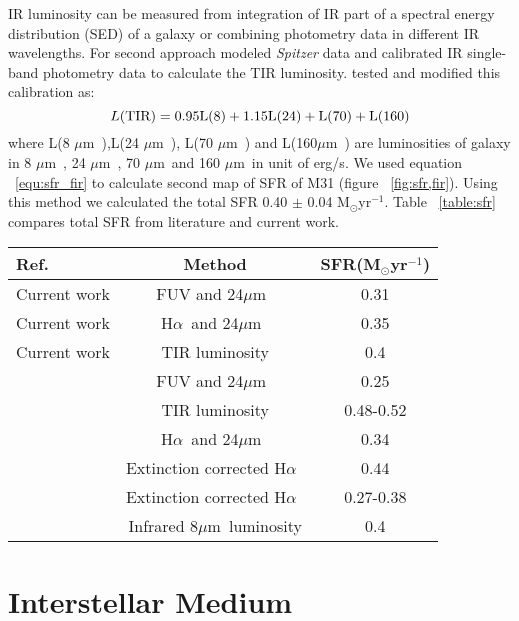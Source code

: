 \documentclass[useAMS,usenatbib]{mn2e}
\newcommand \halpha    {H$\alpha $\ }
\newcommand \um    {$\mu$m\ }
\newcommand \Spitzer {{\it Spitzer }}
\begin{document}
IR luminosity can be measured from integration of IR part of a spectral energy distribution (SED) of a galaxy or combining photometry data in different IR wavelengths. For second approach \cite{Draine07} modeled \Spitzer data and calibrated IR single-band photometry data to calculate the TIR luminosity. \cite{Boquien10} tested and modified this calibration as:
\begin{equation}
 \label{equ: TIR}
L(\rm TIR) = 0.95L(8) + 1.15L(24) + L(70) + L(160)
\end{equation}
where L(8 \um),L(24 \um), L(70 \um) and L(160\um) are luminosities of galaxy in 8 \um, 24 \um, 70 \um and 160 \um in unit of erg/s. We used equation ~\ref{equ:sfr_fir} to calculate second map of SFR of M31 (figure ~\ref{fig:sfr,fir}). Using this method we calculated the total SFR 0.40 $\pm$ 0.04 M$_{\odot}$yr$^{-1}$. Table ~\ref{table:sfr} compares total SFR from literature and current work.

\begin{table*}
\begin{minipage}{100mm}
\caption{Comparison of Total Star Formation Rate of M31}
\label{table:sfr}
\begin{tabular}{@{}lcc}
\hline\hline
Ref.&Method&SFR(M$_{\odot}$yr$^{-1}$) \\
\hline
Current work&FUV and 24\um&0.31\\
Current work&\halpha and 24\um&0.35\\
Current work&TIR luminosity&0.4\\
\cite{Ford13}&FUV and 24\um&0.25\\
\cite{Ford13}&TIR luminosity&0.48-0.52\\
\cite{Azimlu11}& \halpha and 24\um&0.34\\
\cite{Azimlu11}&Extinction corrected \halpha&0.44\\
\cite{Tabatabaei10}&Extinction corrected \halpha&0.27-0.38\\
\cite{Barmby06}&Infrared 8\um luminosity& 0.4\\
\hline
\end{tabular}
\end{minipage}
\end{table*}


\section{Interstellar Medium}
\end{document}
